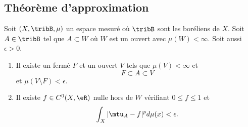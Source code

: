 \subsection{Théorème d'approximation}

\begin{theorem}     \label{ThoAFXXcVa}
    Soit \( (X,\tribB,\mu)\) un espace mesuré où \( \tribB\) sont les boréliens de \( X\). Soit \( A\in \tribB\) tel que \( A\subset W\) où \( W\) est un ouvert avec \( \mu(W)<\infty\). Soit aussi \( \epsilon>0\).
    \begin{enumerate}
        \item
            Il existe un fermé \( F\) et un ouvert \( V\) tels que \( \mu(V)<\infty\) et
            \begin{equation}
                F\subset A\subset V
            \end{equation}
            et \( \mu(V\setminus F)<\epsilon\).
        \item
            Il existe \( f\in C^0(X,\eR)\) nulle hors de \( W\) vérifiant \( 0\leq f\leq 1\) et
            \begin{equation}
                \int_X| \mtu_A-f |^pd\mu(x)<\epsilon.
            \end{equation}
    \end{enumerate}
\end{theorem}

